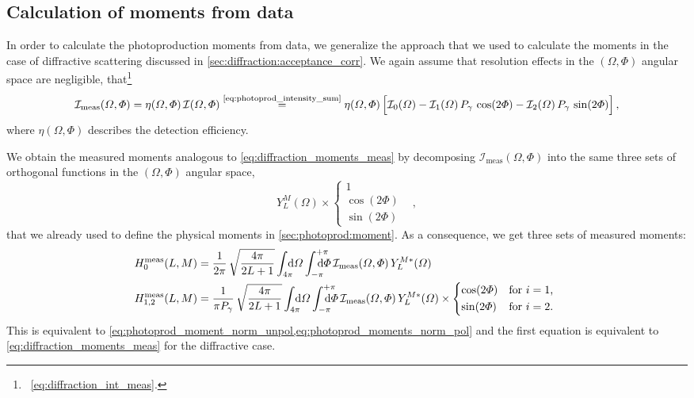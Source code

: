 \subsection{Calculation of moments from data}%
\label{sec:photoprod:moments_data}

In order to calculate the photoproduction moments from data, we
generalize the approach that we used to calculate the moments in the
case of diffractive scattering discussed in
\cref{sec:diffraction:acceptance_corr}.  We again assume that
resolution effects in the $(\Omega, \Phi)$ angular space are
negligible, \ie that\footnote{\Confer\
\cref{eq:diffraction_int_meas}.}
\begin{equation}
  \label{eq:photoprod_intensity_meas}
  \mathcal{I}_\text{meas}(\Omega, \Phi)
  = \eta(\Omega, \Phi)\, \mathcal{I}(\Omega, \Phi)
  \equalUsing{\cref{eq:photoprod_intensity_sum}} \eta(\Omega, \Phi) \sBrk[2]{\mathcal{I}_0(\Omega)
  - \mathcal{I}_1(\Omega)\, P_\gamma\, \cos(2 \Phi)
  - \mathcal{I}_2(\Omega)\, P_\gamma\, \sin(2 \Phi)},
\end{equation}
where $\eta(\Omega, \Phi)$ describes the detection efficiency.

We obtain the measured moments analogous to
\cref{eq:diffraction_moments_meas} by decomposing
$\mathcal{I}_\text{meas}(\Omega, \Phi)$ into the same three sets of
orthogonal functions in the $(\Omega, \Phi)$ angular space, \ie
\begin{equation}
  Y_L^M(\Omega) \times \begin{cases}
    1 & \\
    \cos(2 \Phi) & \\
    \sin(2 \Phi) &
  \end{cases},
\end{equation}
that we already used to define the physical moments in
\cref{sec:photoprod:moment}.  As a consequence, we get three sets of
measured moments:
\begin{align}
  \label{eq:photoprod_moment_meas_unpol}
  H_0^\text{meas}(L, M)
  ={}& \frac{1}{2 \pi}\, \sqrt{\frac{4 \pi}{2 L + 1}} \int_{4 \pi}\!\!\!\! \dif{\Omega} \int_{-\pi}^{+\pi}\hspace{-1.2em} \dif{\Phi}\,
  \mathcal{I}_\text{meas}(\Omega, \Phi)\, Y_L^{M *}(\Omega)
  \\
  \label{eq:photoprod_moments_meas_pol}
  H_{1, 2}^\text{meas}(L, M)
  ={}& \frac{1}{\pi P_\gamma}\, \sqrt{\frac{4 \pi}{2 L + 1}} \int_{4 \pi}\!\!\!\! \dif{\Omega} \int_{-\pi}^{+\pi}\hspace{-1.2em} \dif{\Phi}\,
  \mathcal{I}_\text{meas}(\Omega, \Phi)\, Y_L^{M *}(\Omega) \times \begin{cases*}
    \cos(2 \Phi) & for $i = 1$, \\
    \sin(2 \Phi) & for $i = 2$.
  \end{cases*}
\end{align}
This is equivalent to
\cref{eq:photoprod_moment_norm_unpol,eq:photoprod_moments_norm_pol}
and the first equation is equivalent to
\cref{eq:diffraction_moments_meas} for the diffractive case.

